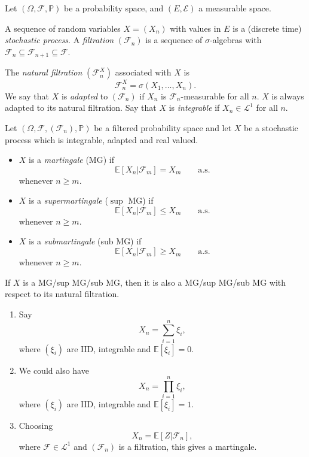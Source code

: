 \documentclass[12pt]{article}
\begin{document}
Let $(\Omega, \mathcal{F}, \mathbb{P})$ be a probability space, and $(E, \mathcal{E})$ a measurable space.

A sequence of random variables $X = (X_n)$ with values in $E$ is a (discrete time) \emph{stochastic process}. A \emph{filtration} $(\mathcal{F}_n)$ is a sequence of $\sigma$-algebras with $\mathcal{F}_n \subseteq \mathcal{F}_{n+1} \subseteq \mathcal{F}$.

The \emph{natural filtration} $(\mathcal{F}_n^X)$ associated with $X$ is
\[
\mathcal{F}_n^X = \sigma(X_1, \ldots, X_n).
\]
We say that $X$ is \emph{adapted} to $(\mathcal{F}_n)$ if $X_n$ is $\mathcal{F}_n$-measurable for all $n$. $X$ is always adapted to its natural filtration. Say that $X$ is \emph{integrable} if $X_n \in \mathcal{L}^1$ for all $n$.

\begin{definition}
	Let $(\Omega, \mathcal{F}, (\mathcal{F}_n), \mathbb{P})$ be a filtered probability space and let $X$ be a stochastic process which is integrable, adapted and real valued.
	\begin{itemize}
		\item $X$ is a \emph{martingale} (MG) if
			\[
				\mathbb{E}[X_n| \mathcal{F}_m] = X_m \qquad \text{a.s.}
			\]
			whenever $n \geq m$.
		\item $X$ is a \emph{supermartingale} ($\sup$ MG) if
			\[
				\mathbb{E}[X_n|\mathcal{F}_m] \leq X_m \qquad \text{a.s.}
			\]
			whenever $n \geq m$.
		\item $X$ is a \emph{submartingale} (sub MG) if
			\[
				\mathbb{E}[X_n|\mathcal{F}_m] \geq X_m \qquad \text{a.s.}
			\]
			whenever $n \geq m$.
	\end{itemize}
\end{definition}

If $X$ is a MG/sup MG/sub MG, then it is also a MG/sup MG/sub MG with respect to its natural filtration.

\begin{exbox}
	\begin{enumerate}
		\item Say
			\[
			X_n = \sum_{i = 1}^n \xi_i,
			\]
			where $(\xi_i)$ are IID, integrable and $\mathbb{E}[\xi_i] = 0$.
		\item We could also have
			\[
			X_n = \prod_{i = 1}^n \xi_i,
			\]
			where $(\xi_i)$ are IID, integrable and $\mathbb{E}[\xi_i] = 1$.
		\item Choosing
			\[
			X_n = \mathbb{E}[Z | \mathcal{F}_n],
			\]
			where $\mathcal{F} \in \mathcal{L}^1$ and $(\mathcal{F}_n)$ is a filtration, this gives a martingale.
	\end{enumerate}	
\end{exbox}
\end{document}
